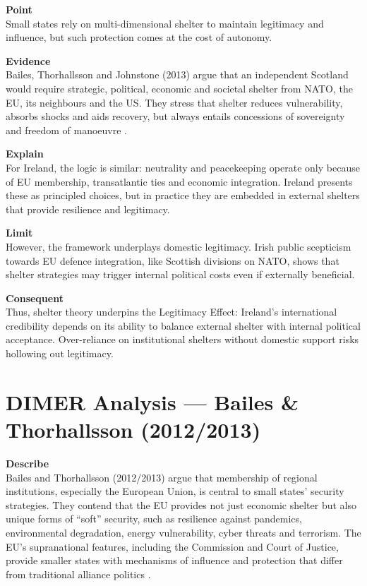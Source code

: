 \textbf{Point} \\
Small states rely on multi-dimensional shelter to maintain legitimacy and influence, but such protection comes at the cost of autonomy.  

\textbf{Evidence} \\
Bailes, Thorhallsson and Johnstone (2013) argue that an independent Scotland would require strategic, political, economic and societal shelter from NATO, the EU, its neighbours and the US. They stress that shelter reduces vulnerability, absorbs shocks and aids recovery, but always entails concessions of sovereignty and freedom of manoeuvre \parencite{BAILES_2013}.  

\textbf{Explain} \\
For Ireland, the logic is similar: neutrality and peacekeeping operate only because of EU membership, transatlantic ties and economic integration. Ireland presents these as principled choices, but in practice they are embedded in external shelters that provide resilience and legitimacy.  

\textbf{Limit} \\
However, the framework underplays domestic legitimacy. Irish public scepticism towards EU defence integration, like Scottish divisions on NATO, shows that shelter strategies may trigger internal political costs even if externally beneficial.  

\textbf{Consequent} \\
Thus, shelter theory underpins the Legitimacy Effect: Ireland’s international credibility depends on its ability to balance external shelter with internal political acceptance. Over-reliance on institutional shelters without domestic support risks hollowing out legitimacy.  

\section*{DIMER Analysis — Bailes \& Thorhallsson (2012/2013)}

\textbf{Describe} \\
Bailes and Thorhallsson (2012/2013) argue that membership of regional institutions, especially the European Union, is central to small states’ security strategies. They contend that the EU provides not just economic shelter but also unique forms of ``soft'' security, such as resilience against pandemics, environmental degradation, energy vulnerability, cyber threats and terrorism. The EU’s supranational features, including the Commission and Court of Justice, provide smaller states with mechanisms of influence and protection that differ from traditional alliance politics \parencite{BAILES_2012}.  

